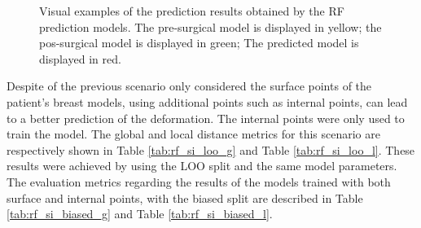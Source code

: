 \begin{figure}[!htb]
\centering
{}
\caption[Visual examples of the prediction results obtained by the RF prediction models]{Visual examples of the prediction results obtained by the RF prediction models. The pre-surgical model is displayed in yellow; the pos-surgical model is displayed in green; The predicted model is displayed in red.}
\label{fig:rf_visual}
\end{figure}

Despite of the previous scenario only considered the surface points of the patient's breast models, using additional points such as internal points, can lead to a better prediction of the deformation. The internal points were only used to train the model. The global and local distance metrics for this scenario are respectively shown in Table \ref{tab:rf_si_loo_g} and Table \ref{tab:rf_si_loo_l}. These results were achieved by using the LOO split and the same model parameters. The evaluation metrics regarding the results of the models trained with both surface and internal points, with the biased split are described in Table \ref{tab:rf_si_biased_g} and Table \ref{tab:rf_si_biased_l}.

